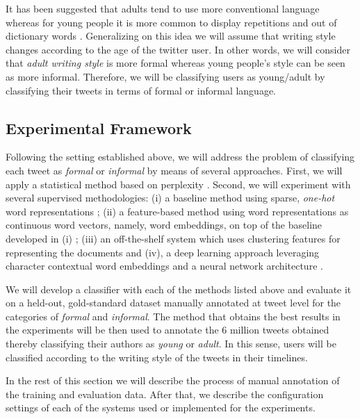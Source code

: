 \documentclass[information,article,submit,moreauthors,pdftex,10pt,a4paper]{Definitions/mdpi}
\begin{document}
It has been suggested that adults tend to use more conventional language \cite{nguyen2013old} whereas for young people it is more common to display repetitions and out of dictionary words \citep{rao2010classifying,rosenthal2011age,morgan2017predicting}. Generalizing on this idea we will assume that writing style changes according to the age of the twitter user. In other words, we will consider that \emph{adult writing style} is more formal whereas young people's style can be seen as more informal. Therefore, we will be classifying users as young/adult by classifying their tweets in terms of formal or informal language.

\subsection{Experimental Framework}\label{sec:exper-fram}

Following the setting established above, we will address the problem of classifying each tweet as \emph{formal} or \emph{informal} by means of several approaches. First, we will apply a statistical method based on perplexity \cite{gamallo2017language}. Second, we will experiment with several supervised methodologies: (i) a baseline method using sparse, \emph{one-hot} word representations \cite{pedregosa2011scikit}; (ii) a feature-based method using word representations as continuous word vectors, namely, word embeddings, on top of the baseline developed in (i) \cite{mikolov2013distributed,pennington-etal-2014-glove,mikolov-etal-2018-advances}; (iii) an off-the-shelf system which uses clustering features for representing the documents \cite{agerri2016robust,agerri2019language} and (iv), a deep learning approach leveraging character contextual word embeddings and a neural network architecture \cite{akbik2018contextual}.

We will develop a classifier with each of the methods listed above and evaluate it on a held-out, gold-standard dataset manually annotated at tweet level for the categories of \emph{formal} and \emph{informal}. The method that obtains the best results in the experiments will be then used to annotate the 6 million tweets obtained thereby classifying their authors as \emph{young} or \emph{adult}. In this sense, users will be classified according to the writing style of the tweets in their timelines.

In the rest of this section we will describe the process of manual annotation of the training and evaluation data. After that, we describe the configuration settings of each of the systems used or implemented for the experiments.
\end{document}
